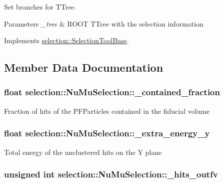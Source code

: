 Set branches for T\-Tree. 


\begin{DoxyParams}{Parameters}
{\em \-\_\-tree} & R\-O\-O\-T T\-Tree with the selection information \\
\hline
\end{DoxyParams}


Implements \hyperlink{classselection_1_1SelectionToolBase_aa97ea5e55391240d8e251dae13897996}{selection\-::\-Selection\-Tool\-Base}.



\subsection{Member Data Documentation}
\hypertarget{classselection_1_1NuMuSelection_a5d7cbf03836116170b56615ab3b073c2}{
\subsubsection[{\-\_\-contained\-\_\-fraction}]{\setlength{\rightskip}{0pt plus 5cm}float selection\-::\-Nu\-Mu\-Selection\-::\-\_\-contained\-\_\-fraction\hspace{0.3cm}{\ttfamily [private]}}}\label{classselection_1_1NuMuSelection_a5d7cbf03836116170b56615ab3b073c2}
Fraction of hits of the P\-F\-Particles contained in the fiducial volume \hypertarget{classselection_1_1NuMuSelection_a9bbe9a46450cfb58e3559d943a5822c8}{
\subsubsection[{\-\_\-extra\-\_\-energy\-\_\-y}]{\setlength{\rightskip}{0pt plus 5cm}float selection\-::\-Nu\-Mu\-Selection\-::\-\_\-extra\-\_\-energy\-\_\-y\hspace{0.3cm}{\ttfamily [private]}}}\label{classselection_1_1NuMuSelection_a9bbe9a46450cfb58e3559d943a5822c8}
Total energy of the unclustered hits on the Y plane \hypertarget{classselection_1_1NuMuSelection_ac2073c16d1ba83437d9fa66b0aa3ea38}{
\subsubsection[{\-\_\-hits\-\_\-outfv}]{\setlength{\rightskip}{0pt plus 5cm}unsigned int selection\-::\-Nu\-Mu\-Selection\-::\-\_\-hits\-\_\-outfv\hspace{0.3cm}{\ttfamily [private]}}}\label{classselection_1_1NuMuSelection_ac2073c16d1ba83437d9fa66b0aa3ea38}
